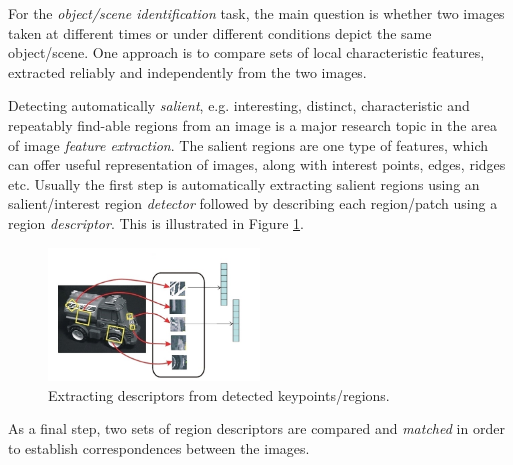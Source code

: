 For the {\em object/scene identification} task, the main question is whether two images taken at different times or under different conditions depict the same object/scene. One approach is to compare sets of local characteristic features, extracted reliably and independently from the two images.

Detecting automatically {\em salient}, e.g.  interesting, distinct, characteristic and repeatably find-able regions from an image is a major research topic in the area of image {\em feature extraction}. The salient regions are one type of features, which can offer useful representation of images, along with interest points, edges, ridges etc. Usually the first step is automatically extracting salient regions using an salient/interest region {\em detector} followed by describing each region/patch using a region {\em descriptor}. This is illustrated in Figure \ref{fig:keydescr}.

\begin{figure}[H]
\begin{center}
\includegraphics[width=0.5\textwidth]{fig/KeypointsDescriptors}
\end{center}
\caption{Extracting descriptors from detected keypoints/regions.}
\label{fig:keydescr}
\end{figure}

As a final step, two sets of region descriptors are compared and {\em matched} in order to establish correspondences between the images.

